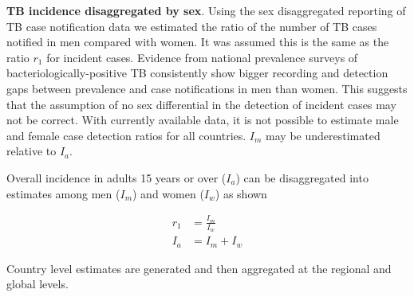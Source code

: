 \textbf{TB incidence disaggregated by sex}. Using the sex disaggregated reporting of TB case notification data we estimated the ratio of the number of TB cases notified in men compared with women. It was assumed this is the same as the ratio $r_1$ for incident cases. Evidence from national prevalence surveys of bacteriologically-positive TB consistently show bigger recording and detection gaps between prevalence and case notifications in men than women. This suggests that the assumption of no sex differential in the detection of incident cases may not be correct. With currently available data, it is not possible to estimate male and female case detection ratios for all countries. $I_m$ may be underestimated relative to $I_a$.    

Overall incidence in adults 15 years or over ($I_a$) can be disaggregated into estimates among men ($I_m$) and women ($I_w$) as shown

\begin{align}
r_1 &= \frac{I_m}{I_w} \\
I_a &= I_m + I_w
\end{align}

Country level estimates are generated and then aggregated at the regional and global levels.



